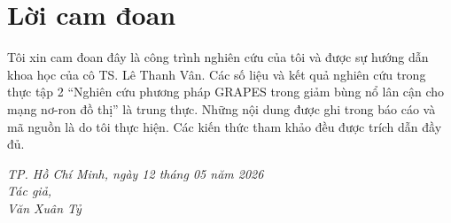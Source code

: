 \chapter*{Lời cam đoan}
Tôi xin cam đoan đây là công trình nghiên cứu của tôi và được sự hướng dẫn khoa học của cô TS. Lê Thanh Vân. Các số liệu và kết quả nghiên cứu trong thực tập 2 ``Nghiên cứu phương pháp GRAPES trong giảm bùng nổ lân cận cho mạng nơ-ron đồ thị'' là trung thực. Những nội dung được ghi trong báo cáo và mã nguồn là do tôi thực hiện. Các kiến thức tham khảo đều được trích dẫn đầy đủ.
\begin{flushright}
\textit{
TP. Hồ Chí Minh, ngày 12 tháng 05 năm 2026\\
Tác giả,\\
Văn Xuân Tỷ
}
\end{flushright}